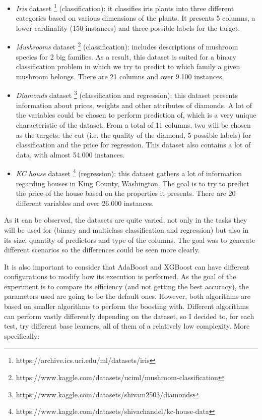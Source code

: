 \documentclass{article}
\begin{document}
\begin{itemize}
    \item \textit{Iris} dataset \footnote{https://archive.ics.uci.edu/ml/datasets/iris} (classification): it classifies iris plants into three different categories based on various dimensions of the plants. It presents 5 columns, a lower cardinality (150 instances) and three possible labels for the target.
    \item \textit{Mushrooms} dataset \footnote{https://www.kaggle.com/datasets/uciml/mushroom-classification} (classification): includes descriptions of mushroom species for 2 big families. As a result, this dataset is suited for a binary classification problem in which we try to predict to which family a given mushroom belongs. There are 21 columns and over 9.100 instances.
    \item \textit{Diamonds} dataset \footnote{https://www.kaggle.com/datasets/shivam2503/diamonds} (classification and regression): this dataset presents information about prices, weights and other attributes of diamonds. A lot of the variables could be chosen to perform prediction of, which is a very unique characteristic of the dataset. From a total of 11 columns, two will be chosen as the targets: the cut (i.e. the quality of the diamond, 5 possible labels) for classification and the price for regression. This dataset also contains a lot of data, with almost 54.000 instances.
    \item \textit{KC house} dataset \footnote{https://www.kaggle.com/datasets/shivachandel/kc-house-data} (regression): this dataset gathers a lot of information regarding houses in King County, Washington. The goal is to try to predict the price of the house based on the properties it presents. There are 20 different variables and over 26.000 instances.
\end{itemize}

As it can be observed, the datasets are quite varied, not only in the tasks they will be used for (binary and multiclass classification and regression) but also in its size, quantity of predictors and type of the columns. The goal was to generate different scenarios so the differences could be seen more clearly.

It is also important to consider that AdaBoost and XGBoost can have different configurations to modify how its execution is performed. As the goal of the experiment is to compare its efficiency (and not getting the best accuracy), the parameters used are going to be the default ones. However, both algorithms are based on smaller algorithms to perform the boosting with. Different algorithms can perform vastly differently depending on the dataset, so I decided to, for each test, try different base learners, all of them of a relatively low complexity. More specifically:
\end{document}
